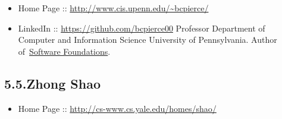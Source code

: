 \documentclass[12pt,twoside]{article}
\begin{document}
\begin{itemize}[noitemsep,topsep=\mdcompacttopsep]%

\item{}Home Page :: \href{http://www.cis.upenn.edu/~bcpierce/}{{\ttfamily http://\hspace{0pt}www.\hspace{0pt}cis.\hspace{0pt}upenn.\hspace{0pt}edu/\hspace{0pt}\textasciitilde{}bcpierce/\hspace{0pt}}}%

\item{}LinkedIn :: \href{https://github.com/bcpierce00}{{\ttfamily https://\hspace{0pt}github.\hspace{0pt}com/\hspace{0pt}bcpierce00}}
Professor Department of Computer and Information Science University of Pennsylvania.
Author of~\href{http://www.cis.upenn.edu/~bcpierce/sf}{Software Foundations}.%
\end{itemize}%

\subsection{5.5.\hspace*{0.5em}Zhong Shao}\label{sec-zhong-shao}%

\begin{itemize}[noitemsep,topsep=\mdcompacttopsep]%

\item{}Home Page :: \href{http://cs-www.cs.yale.edu/homes/shao/}{{\ttfamily http://\hspace{0pt}cs-\hspace{0pt}www.\hspace{0pt}cs.\hspace{0pt}yale.\hspace{0pt}edu/\hspace{0pt}homes/\hspace{0pt}shao/\hspace{0pt}}}%
\end{itemize}%
\end{document}
